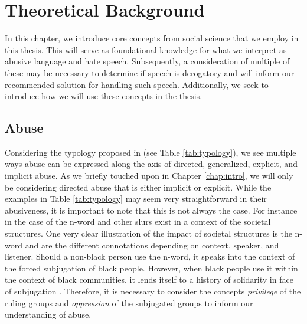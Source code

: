 
\chapter{Theoretical Background}\label{chap:socialscience}
In this chapter, we introduce core concepts from social science that we employ in this thesis. This will serve as foundational knowledge for what we interpret as abusive language and hate speech. Subsequently, a consideration of multiple of these may be necessary to determine if speech is derogatory and will inform our recommended solution for handling such speech. Additionally, we seek to introduce how we will use these concepts in the thesis.

\section{Abuse}
Considering the typology proposed in \cite{Waseem:2017} (see Table \ref{tab:typology}), we see multiple ways abuse can be expressed along the axis of directed, generalized, explicit, and implicit abuse. As we briefly touched upon in Chapter \ref{chap:intro}, we will only be considering directed abuse that is either implicit or explicit. While the examples in Table \ref{tab:typology} may seem very straightforward in their abusiveness, it is important to note that this is not always the case. For instance in the case of the n-word and other slurs exist in a context of the societal structures. One very clear illustration of the impact of societal structures is the n-word and are the different connotations depending on context, speaker, and listener. Should a non-black person use the n-word, it speaks into the context of the forced subjugation of black people. However, when black people use it within the context of black communities, it lends itself to a history of solidarity in face of subjugation \citep{Rahman:2011}. Therefore, it is necessary to consider the concepts {\it privilege} of the ruling groups and {\it oppression} of the subjugated groups to inform our understanding of abuse.

